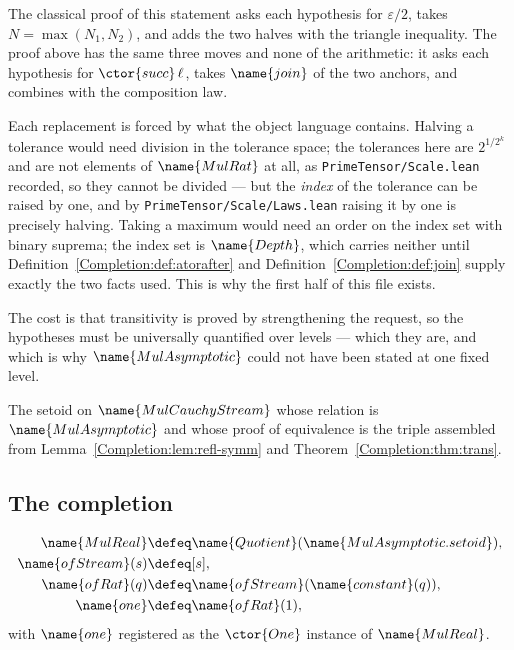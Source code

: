 \begin{designnote}
\label{Completion:note:halving}
The classical proof of this statement asks each hypothesis for
$\varepsilon/2$, takes $N = \max(N_1, N_2)$, and adds the two halves with the
triangle inequality.  The proof above has the same three moves and none of the
arithmetic: it asks each hypothesis for $\ctor{succ}\,\ell$, takes
$\name{join}$ of the two anchors, and combines with the composition law.

Each replacement is forced by what the object language contains.  Halving a
tolerance would need division in the tolerance space; the tolerances here are
$2^{1/2^{k}}$ and are not elements of $\name{MulRat}$ at all, as
\texttt{PrimeTensor/Scale.lean} recorded, so they cannot be divided --- but the
\emph{index} of the tolerance can be raised by one, and by
\texttt{PrimeTensor/Scale/Laws.lean} raising it by one is precisely halving.
Taking a maximum would need an order on the index set with binary suprema; the
index set is $\name{Depth}$, which carries neither until
Definition~\ref{Completion:def:atorafter} and
Definition~\ref{Completion:def:join} supply exactly the two facts used.  This
is why the first half of this file exists.

The cost is that transitivity is proved by strengthening the request, so the
hypotheses must be universally quantified over levels --- which they are, and
which is why $\name{MulAsymptotic}$ could not have been stated at one fixed
level.
\end{designnote}

\begin{definition}\label{Completion:def:setoid}
The setoid on $\name{MulCauchyStream}$ whose relation is
$\name{MulAsymptotic}$ and whose proof of equivalence is the triple assembled
from Lemma~\ref{Completion:lem:refl-symm} and
Theorem~\ref{Completion:thm:trans}.
\end{definition}

\subsection{The completion}

\begin{definition}
\label{Completion:def:mulreal}
\begin{align*}
  \name{MulReal} &\defeq
    \name{Quotient}(\name{MulAsymptotic.setoid}), \\
  \name{ofStream}(s) &\defeq [s], \\
  \name{ofRat}(q) &\defeq \name{ofStream}(\name{constant}(q)), \\
  \name{one} &\defeq \name{ofRat}(1),
\end{align*}
with $\name{one}$ registered as the $\ctor{One}$ instance of
$\name{MulReal}$.
\end{definition}

